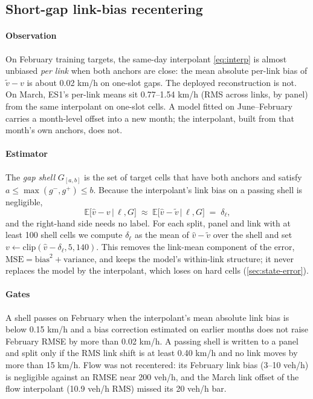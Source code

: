 \subsection{Short-gap link-bias recentering}\label{sec:recenter}
\paragraph{Observation} On February training targets, the same-day interpolant \cref{eq:interp} is almost unbiased
\emph{per link} when both anchors are close: the mean absolute per-link bias of $\tilde v-v$ is about 0.02 km/h on
one-slot gaps. The deployed reconstruction is not. On March, ES1's per-link means sit 0.77--1.54 km/h (RMS across
links, by panel) from the same interpolant on one-slot cells. A model fitted on June--February carries a month-level
offset into a new month; the interpolant, built from that month's own anchors, does not.

\paragraph{Estimator} The \emph{gap shell} $G_{[a,b]}$ is the set of target cells that have both anchors and satisfy
$a\le\max(g^-,g^+)\le b$. Because the interpolant's link bias on a passing shell is negligible,
\begin{equation}
  \mathbb E\big[\hat v-v \,\big|\, \ell, G\big] \;\approx\; \mathbb E\big[\hat v-\tilde v \,\big|\, \ell, G\big]
  \;=\; \delta_\ell ,
  \label{eq:recenter}
\end{equation}
and the right-hand side needs no label. For each split, panel and link with at least 100 shell cells we compute
$\delta_\ell$ as the mean of $\hat v-\tilde v$ over the shell and set $v\leftarrow\mathrm{clip}(\hat v-\delta_\ell,5,140)$.
This removes the link-mean component of the error, $\mathrm{MSE}=\mathrm{bias}^2+\mathrm{variance}$, and keeps
the model's within-link structure; it never replaces the model by the interpolant, which loses on hard cells
(\cref{sec:state-error}).

\paragraph{Gates} A shell passes on February when the interpolant's mean absolute link bias is below 0.15 km/h and a
bias correction estimated on earlier months does not raise February RMSE by more than 0.02 km/h. A passing shell is
written to a panel and split only if the RMS link shift is at least 0.40 km/h and no link moves by more than 15 km/h.
Flow was not recentered: its February link bias (3--10 veh/h) is negligible against an RMSE near 200 veh/h, and the
March link offset of the flow interpolant (10.9 veh/h RMS) missed its 20 veh/h bar.

